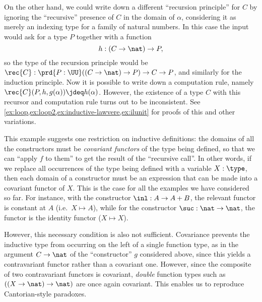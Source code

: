 On the other hand, we could write down a different ``recursion principle'' for $C$ by ignoring the ``recursive'' presence of $C$ in the domain of $\alpha$, considering it as merely an indexing type for a family of natural numbers.
In this case the input would ask for a type $P$ together with a function
\begin{equation*}
  h:(C\to \nat) \to P,
\end{equation*}
so the type of the recursion principle would be $\rec{C}:\prd{P:\UU} ((C\to \nat) \to P) \to C\to P$, and similarly for the induction principle.
Now it is possible to write down a computation rule, namely $\rec{C}(P,h,g(\alpha))\jdeq h(\alpha)$.
However, the existence of a type $C$ with this recursor and computation rule turns out to be inconsistent.
See \autoref{ex:loop,ex:loop2,ex:inductive-lawvere,ex:ilunit} for proofs of this and other variations.

This example suggests one restriction on inductive definitions: the domains of all the constructors must be \emph{covariant functors} of the type being defined, so that we can ``apply $f$ to them'' to get the result of the ``recursive call''.
In other words, if we replace all occurrences of the type being defined with a variable
%
$X:\type$, then each domain of a constructor
%
must be an expression that can be made into a covariant functor of $X$.
This is the case for all the examples we have considered so far.
For instance, with the constructor $\inl:A\to A+B$, the relevant functor is constant at $A$ (i.e.\ $X\mapsto A$), while for the constructor $\suc:\nat\to\nat$, the functor is the identity functor ($X\mapsto X$).

However, this necessary condition is also not sufficient.
Covariance prevents the inductive type from occurring on the left of a single function type, as in the argument $C\to\nat$ of the ``constructor'' $g$ considered above, since this yields a contravariant functor rather than a covariant one.
However, since the composite of two contravariant functors is covariant, \emph{double} function types such as $((X\to \nat)\to \nat)$ are once again covariant.
This enables us to reproduce Cantorian-style paradoxes.

